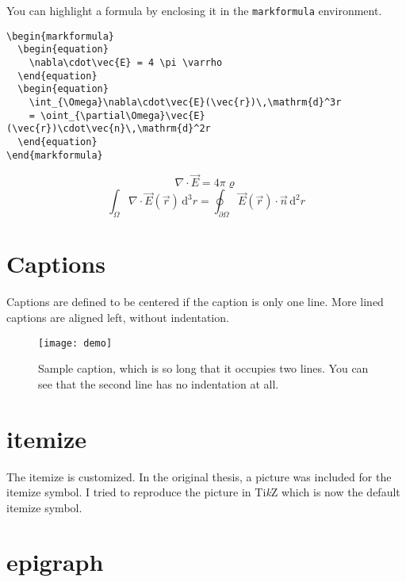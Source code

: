 \documentclass[book]{scrbook}
\begin{document}
You can highlight a formula by enclosing it in the \verb|markformula| environment.
\begin{verbatim}
\begin{markformula}
  \begin{equation}
    \nabla\cdot\vec{E} = 4 \pi \varrho
  \end{equation}
  \begin{equation}
    \int_{\Omega}\nabla\cdot\vec{E}(\vec{r})\,\mathrm{d}^3r
    = \oint_{\partial\Omega}\vec{E}(\vec{r})\cdot\vec{n}\,\mathrm{d}^2r
  \end{equation}
\end{markformula}
\end{verbatim}
\begin{markformula}
  \begin{equation}
    \nabla\cdot\vec{E} = 4 \pi \varrho
  \end{equation}
  \begin{equation}
    \int_{\Omega}\nabla\cdot\vec{E}(\vec{r})\,\mathrm{d}^3r
    = \oint_{\partial\Omega}\vec{E}(\vec{r})\cdot\vec{n}\,\mathrm{d}^2r
  \end{equation}
\end{markformula}

\section{Captions}

Captions are defined to be centered if the caption is only one line. More lined captions are aligned left, without indentation.

\begin{figure}[htpb]
  \centering
  \texttt{[image: demo]}
  \caption{Sample caption, which is so long that it occupies two lines. You can see that the second line has no indentation at all.}
  \label{fig:xyz}
\end{figure}

\section{itemize}

The itemize is customized. In the original thesis, a picture was included for the itemize symbol. I tried to reproduce the picture in Ti\textit{k}Z which is now the default itemize symbol. 

\section{epigraph}
\end{document}

